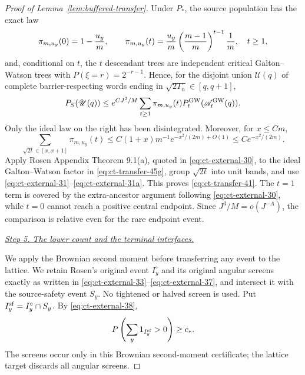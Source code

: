 \begin{proof}[Proof of Lemma~\ref{lem:buffered-transfer}]
Under $P_*$, the source population has the exact law
\begin{equation}
\pi_{m,u_y}(0)=1-{u_y\over m},\qquad
 \pi_{m,u_y}(t)={u_y\over m}
       \left({m-1\over m}\right)^{t-1}{1\over m},
       \quad t\ge1,\label{eq:ct-transfer-45g0}
\end{equation}
and, conditional on $t$, the $t$ descendant trees are independent
critical Galton--Watson trees with
$P(\xi=r)=2^{-r-1}$.  Hence, for the disjoint union
$\mathscr U(q)$ of complete barrier-respecting words ending in
$\sqrt{2T_n}\in[q,q+1]$,
\begin{equation}
P_S(\mathscr U(q))
 \le e^{CJ^3/M}\sum_{t\ge1}\pi_{m,u_y}(t)
       P_t^{\rm GW}(\mathscr A_t^{\rm GW}(q)).\label{eq:ct-transfer-45g}
\end{equation}
Only the ideal law on the right has been disintegrated.  Moreover, for
$x\le Cm$,
\begin{equation}
\sum_{\sqrt{2t}\in[x,x+1]}\pi_{m,u_y}(t)
 \le C(1+x)m^{-1}e^{-x^2/(2m)+O(1)}
 \le Ce^{-x^2/(2m)}.\label{eq:ct-transfer-45gprime}
\end{equation}
Apply Rosen Appendix Theorem 9.1(a), quoted in \eqref{eq:ct-external-30}, to the
ideal Galton--Watson factor in \eqref{eq:ct-transfer-45g}, group $\sqrt{2t}$ into unit bands,
and use \eqref{eq:ct-external-31}--\eqref{eq:ct-external-31a}.  This proves \eqref{eq:ct-transfer-41}.  The $t=1$ term is covered by
the extra-ancestor argument following \eqref{eq:ct-external-30}, while $t=0$ cannot reach a
positive central endpoint.  Since $J^3/M=o(J^{-A})$, the comparison is
relative even for the rare endpoint event.

\smallskip\noindent
\underline{\textit{Step 5. The lower count and the terminal interfaces.}}

We apply the Brownian second moment before transferring any event to the lattice.  We retain Rosen's original event
$I_y^\circ$ and its original angular screens exactly as written in
\eqref{eq:ct-external-33}--\eqref{eq:ct-external-37}, and intersect it with the source-safety event $S_y$.
No tightened or halved screen is used.  Put
$I_y^{\rm sf}=I_y^\circ\cap S_y$.  By \eqref{eq:ct-external-38},
\begin{equation}
P\left(\sum_y1_{I_y^{\rm sf}}>0\right)\ge c_* .\label{eq:ct-transfer-46}
\end{equation}
The screens occur only in this Brownian second-moment certificate; the
lattice target discards all angular screens.


\end{proof}
